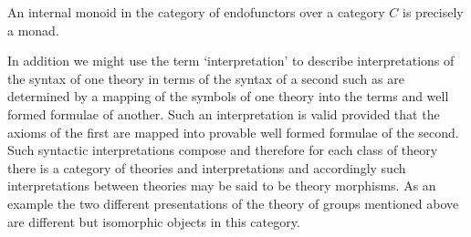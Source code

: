 \noindent An internal monoid in the category of endofunctors over a category $C$ is precisely a monad.

\note In addition we might use the term `interpretation' to describe interpretations of the syntax of one theory in terms of the syntax of a second
such as are determined by a mapping of the symbols of one theory into the terms and well formed formulae of another. 
Such an interpretation is valid provided that the axioms of the first are mapped into provable well formed formulae of the second.  Such syntactic interpretations compose and therefore for each class of theory there is a category of theories and interpretations and accordingly such 
interpretations between theories may be said to be theory morphisms.
As an example the two different presentations of the theory of groups mentioned above are different but isomorphic objects in this category. 

